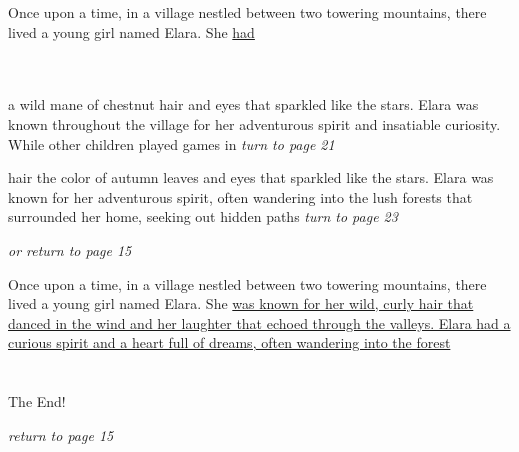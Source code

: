 \documentclass{memoir}
\begin{document}
        


        \hspace{1cm}\vfill
        \begin{minipage}{3in}
        \LARGE
        Once upon a time, in a village nestled between two towering mountains, there lived a young girl named Elara. She \ul{had}\\ \vspace{5mm} \\
  \\ 

        \hspace{1cm}\begin{minipage}{6cm}
        \normalsize
            a wild mane of chestnut hair and eyes that sparkled like the stars. Elara was known throughout the village for her adventurous spirit and insatiable curiosity. While other children played games in \hfill \textit{turn to page 21}\\ \vspace{5mm}

hair the color of autumn leaves and eyes that sparkled like the stars. Elara was known for her adventurous spirit, often wandering into the lush forests that surrounded her home, seeking out hidden paths \hfill \textit{turn to page 23}\\ \vspace{5mm}

\hfill \textit{or return to page 15}
        \end{minipage} 
        \end{minipage}
        \hspace{1cm}\vfill
        \cleardoublepage

        


        \hspace{1cm}\vfill
        \begin{minipage}{3in}
        \LARGE
        Once upon a time, in a village nestled between two towering mountains, there lived a young girl named Elara. She \ul{was known for her wild, curly hair that danced in the wind and her laughter that echoed through the valleys. Elara had a curious spirit and a heart full of dreams, often wandering into the forest}\\ \vspace{5mm} \\
 \\\vspace{1cm} The End! \\ 

        \hspace{1cm}\begin{minipage}{6cm}
        \normalsize
            \hfill \textit{return to page 15}
        \end{minipage} 
        \end{minipage}
        \hspace{1cm}\vfill
        \cleardoublepage
\end{document}
